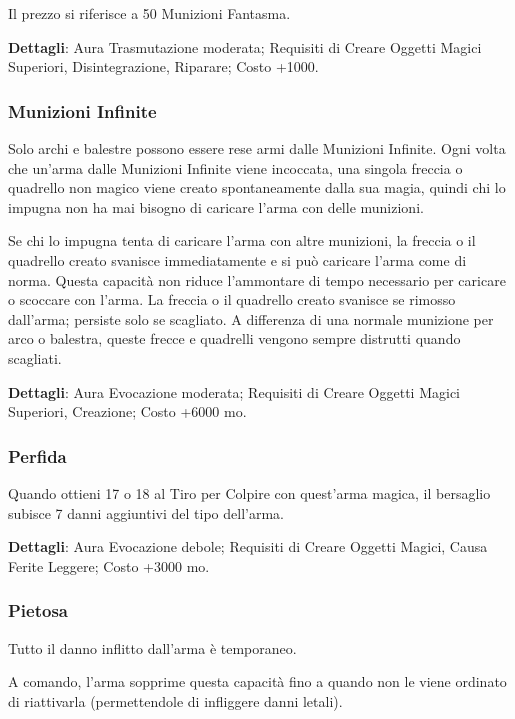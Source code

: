 \begin{multicols}{2}
	Il prezzo si riferisce a 50 Munizioni Fantasma.

	\textbf{Dettagli}: Aura Trasmutazione moderata; Requisiti di Creare Oggetti Magici Superiori, Disintegrazione, Riparare; Costo +1000.

	\subsubsection*{Munizioni Infinite}

	Solo archi e balestre possono essere rese armi dalle Munizioni Infinite. Ogni volta che un'arma dalle Munizioni Infinite viene incoccata, una singola freccia o quadrello non magico viene creato spontaneamente dalla sua magia, quindi chi lo impugna non ha mai bisogno di caricare l'arma con delle munizioni.

	Se chi lo impugna tenta di caricare l'arma con altre munizioni, la freccia o il quadrello creato svanisce immediatamente e si può caricare l'arma come di norma. Questa capacità non riduce l'ammontare di tempo necessario per caricare o scoccare con l'arma. La freccia o il quadrello creato svanisce se rimosso dall'arma; persiste solo se scagliato. A differenza di una normale munizione per arco o balestra, queste frecce e quadrelli vengono sempre distrutti quando scagliati.

	\textbf{Dettagli}: Aura Evocazione moderata; Requisiti di Creare Oggetti Magici Superiori, Creazione; Costo +6000 mo.

	\subsubsection*{Perfida}

	Quando ottieni 17 o 18 al Tiro per Colpire con quest'arma magica, il bersaglio subisce 7 danni aggiuntivi del tipo dell'arma.

	\textbf{Dettagli}: Aura Evocazione debole; Requisiti di Creare Oggetti Magici, Causa Ferite Leggere; Costo +3000 mo.

	\subsubsection*{Pietosa}

	Tutto il danno inflitto dall'arma è temporaneo.

	A comando, l'arma sopprime questa capacità fino a quando non le viene ordinato di riattivarla (permettendole di infliggere danni letali).


\end{multicols}
